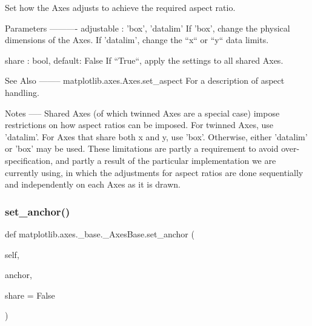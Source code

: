 \begin{DoxyVerb}Set how the Axes adjusts to achieve the required aspect ratio.

Parameters
----------
adjustable : {'box', 'datalim'}
    If 'box', change the physical dimensions of the Axes.
    If 'datalim', change the ``x`` or ``y`` data limits.

share : bool, default: False
    If ``True``, apply the settings to all shared Axes.

See Also
--------
matplotlib.axes.Axes.set_aspect
    For a description of aspect handling.

Notes
-----
Shared Axes (of which twinned Axes are a special case)
impose restrictions on how aspect ratios can be imposed.
For twinned Axes, use 'datalim'.  For Axes that share both
x and y, use 'box'.  Otherwise, either 'datalim' or 'box'
may be used.  These limitations are partly a requirement
to avoid over-specification, and partly a result of the
particular implementation we are currently using, in
which the adjustments for aspect ratios are done sequentially
and independently on each Axes as it is drawn.
\end{DoxyVerb}
 \mbox{\label{classmatplotlib_1_1axes_1_1__base_1_1__AxesBase_abe1076b7fa35790ed221223197bb9929}} 
\subsubsection{\texorpdfstring{set\+\_\+anchor()}{set\_anchor()}}
{\footnotesize\ttfamily def matplotlib.\+axes.\+\_\+base.\+\_\+\+Axes\+Base.\+set\+\_\+anchor (\begin{DoxyParamCaption}\item[{}]{self,  }\item[{}]{anchor,  }\item[{}]{share = {\ttfamily False} }\end{DoxyParamCaption})}

